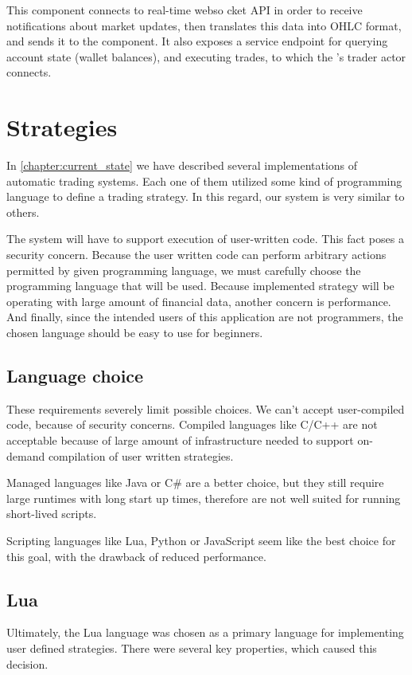 This component connects to real-time webso cket API in order to receive notifications about market updates,
then translates this data into OHLC format, and sends it to the  component.
It also exposes a service endpoint for querying account state (wallet balances), and executing trades, to which the
's trader actor connects.

\section{Strategies}
\label{design:eval}
In \autoref{chapter:current_state} we have described several implementations of automatic trading systems. Each one of them
utilized some kind of programming language to define a trading strategy. In this regard, our system is very similar to others.

The system will have to support execution of user-written code. This fact poses a security concern. Because the user
written code can perform arbitrary actions permitted by given programming language, we must carefully choose the programming
language that will be used. Because implemented strategy will be operating with large amount of financial data, another
concern is performance. And finally, since the intended users of this application are not programmers, the chosen language
should be easy to use for beginners.

\subsection{Language choice}
These requirements severely limit possible choices. We can't accept user-compiled code, because of security concerns.
Compiled languages like C/C++ are not acceptable because of large amount of infrastructure needed to support
on-demand compilation of user written strategies.

Managed languages like Java or C\# are a better choice, but they still require large runtimes with long start up times, therefore
are not well suited for running short-lived scripts.

Scripting languages like Lua, Python or JavaScript seem like the best choice for this goal, with the drawback of
reduced performance.

\subsection{Lua}
Ultimately, the Lua language was chosen as a primary language for implementing user defined strategies. There were several
key properties, which caused this decision.

